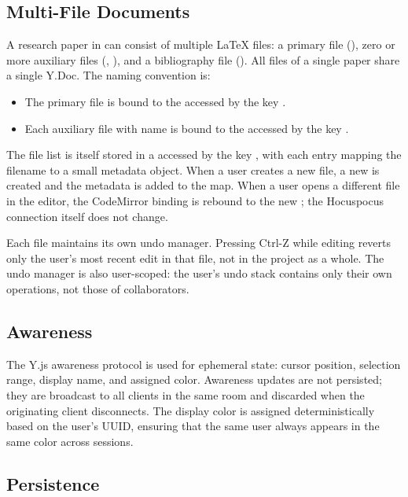 \subsection{Multi-File Documents}

A research paper in \sh{} can consist of multiple LaTeX files: a primary file (), zero or more auxiliary files (, ), and a bibliography file (). All files of a single paper share a single Y.Doc. The naming convention is:

\begin{itemize}
    \item The primary file is bound to the  accessed by the key .
    \item Each auxiliary file with name  is bound to the  accessed by the key .
\end{itemize}

The file list is itself stored in a  accessed by the key , with each entry mapping the filename to a small metadata object. When a user creates a new file, a new  is created and the metadata is added to the map. When a user opens a different file in the editor, the CodeMirror binding is rebound to the new ; the Hocuspocus connection itself does not change.

Each file maintains its own undo manager. Pressing Ctrl-Z while editing  reverts only the user's most recent edit in that file, not in the project as a whole. The undo manager is also user-scoped: the user's undo stack contains only their own operations, not those of collaborators.

\subsection{Awareness}

The Y.js awareness protocol is used for ephemeral state: cursor position, selection range, display name, and assigned color. Awareness updates are not persisted; they are broadcast to all clients in the same room and discarded when the originating client disconnects. The display color is assigned deterministically based on the user's UUID, ensuring that the same user always appears in the same color across sessions.

\subsection{Persistence}

